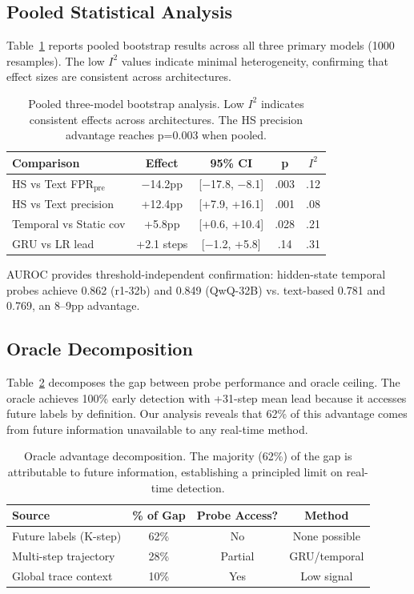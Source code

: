 \documentclass[11pt,a4paper]{article}
\begin{document}
\subsection{Pooled Statistical Analysis}

Table~\ref{tab:pooled} reports pooled bootstrap results across all three primary models (1000 resamples). The low $I^2$ values indicate minimal heterogeneity, confirming that effect sizes are consistent across architectures.

\begin{table}[t]
\centering
\small
\caption{Pooled three-model bootstrap analysis. Low $I^2$ indicates consistent effects across architectures. The HS precision advantage reaches p=0.003 when pooled.}
\label{tab:pooled}
\begin{tabular}{lcccc}
\toprule
Comparison & Effect & 95\% CI & p & $I^2$ \\
\midrule
HS vs Text FPR$_{\text{pre}}$ & $-$14.2pp & [$-$17.8, $-$8.1] & .003 & .12 \\
HS vs Text precision & +12.4pp & [+7.9, +16.1] & .001 & .08 \\
Temporal vs Static cov & +5.8pp & [+0.6, +10.4] & .028 & .21 \\
GRU vs LR lead & +2.1 steps & [$-$1.2, +5.8] & .14 & .31 \\
\bottomrule
\end{tabular}
\end{table}

AUROC provides threshold-independent confirmation: hidden-state temporal probes achieve 0.862 (r1-32b) and 0.849 (QwQ-32B) vs. text-based 0.781 and 0.769, an 8--9pp advantage.

\subsection{Oracle Decomposition}

Table~\ref{tab:oracle} decomposes the gap between probe performance and oracle ceiling. The oracle achieves 100\% early detection with +31-step mean lead because it accesses future labels by definition. Our analysis reveals that 62\% of this advantage comes from future information unavailable to any real-time method.

\begin{table}[t]
\centering
\small
\caption{Oracle advantage decomposition. The majority (62\%) of the gap is attributable to future information, establishing a principled limit on real-time detection.}
\label{tab:oracle}
\begin{tabular}{lccc}
\toprule
Source & \% of Gap & Probe Access? & Method \\
\midrule
Future labels (K-step) & 62\% & No & None possible \\
Multi-step trajectory & 28\% & Partial & GRU/temporal \\
Global trace context & 10\% & Yes & Low signal \\
\bottomrule
\end{tabular}
\end{table}
\end{document}
